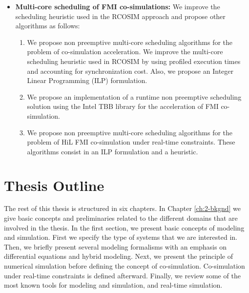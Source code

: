 \begin{itemize}
\begin{enumerate}
\setcounter{enumTemp}{\theenumi}

\end{enumerate}

\item \textbf{Multi-core scheduling of FMI co-simulations:} We improve the scheduling heuristic used in the RCOSIM approach and propose other algorithms as follows:

\begin{enumerate}

\setcounter{enumi}{\theenumTemp}

\item We propose non preemptive multi-core scheduling algorithms for the problem of co-simulation acceleration. We improve the multi-core scheduling heuristic used in RCOSIM by using profiled execution times and accounting for synchronization cost. Also, we propose an Integer Linear Programming (ILP) formulation.

\item We propose an implementation of a runtime non preemptive scheduling solution using the Intel TBB library \cite{reinders:2007} for the acceleration of FMI co-simulation.

\item We propose non preemptive multi-core scheduling algorithms for the problem of HiL FMI co-simulation under real-time constraints. These algorithms consist in an ILP formulation and a heuristic.   

\end{enumerate}

\end{itemize}

\section{Thesis Outline}

The rest of this thesis is structured in six chapters. In Chapter \ref{ch:2-bkgnd} we give basic concepts and preliminaries related to the different domains that are involved in the thesis. In the first section, we present basic concepts of modeling and simulation. First we specify the type of systems that we are interested in. Then, we briefly present several modeling formalisms with an emphasis on differential equations and hybrid modeling. Next, we present the principle of numerical simulation before defining the concept of co-simulation. Co-simulation under real-time constraints is defined afterward. Finally, we review some of the most known tools for modeling and simulation, and real-time simulation.

